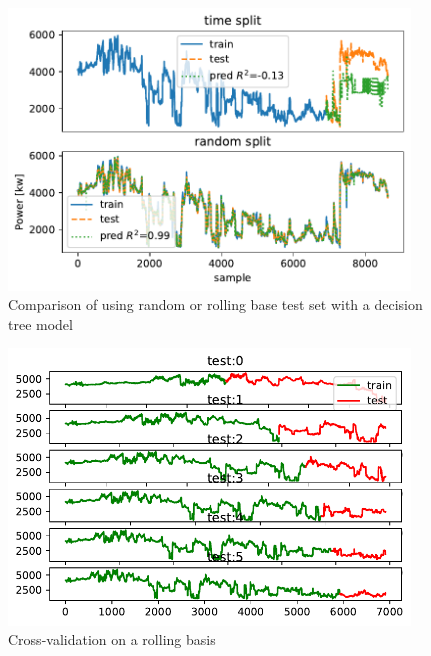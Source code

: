 \begin{figure}[H]
\begin{center}\includegraphics[width = 0.95\textwidth]{figures/train_test_random.pdf}\end{center}
\vspace{-0.7cm}
\caption{Comparison of using random or rolling base test set with a decision tree model }
\label{fig:train_test_random}
\end{figure}
\begin{figure}[H]
\begin{center}\includegraphics[width = 0.95\textwidth]{figures/rolling_basis.pdf}\end{center}
\vspace{-0.7cm}
\caption{Cross-validation on a rolling basis}
\label{fig:rolling_basis}
\end{figure}
